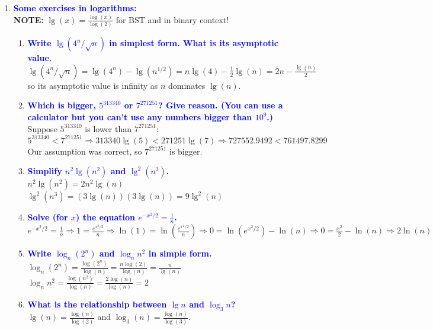 \documentclass[11pt]{article}
\begin{document}
\begin{enumerate}
    
    
\item \textbf{\textcolor{blue}{Some exercises in logarithms:}}
    \\ \textbf{NOTE: } $\lg(x) = \frac{\log(x)}{\log(2)}$ for BST and in binary context!
    \begin{enumerate}
    \item \textbf{\textcolor{blue}{Write $\lg(4^n/\sqrt{n})$ in simplest form.  What is its asymptotic value.}}
        \\ $\lg(4^n/\sqrt{n}) = \lg(4^n) - \lg(n^{1/2}) = n\lg(4) - \frac{1}{2}\lg(n) = 2n - \frac{\lg(n)}{2}$ so its asymptotic value is infinity as $n$ dominates $\lg(n)$.
    \item \textbf{\textcolor{blue}{Which is bigger, $5^{313340}$ or $7^{271251}$? Give reason. (You can use a calculator but you can't use any numbers bigger than $10^9$.)}}
        \\ Suppose $5^{313340}$ is lower than $7^{271251}$:
        \\ $5^{313340} < 7^{271251} \Rightarrow 313340\lg(5) < 271251\lg(7) \Rightarrow 727552.9492 < 761497.8299$
        \\ Our assumption was correct, so $7^{271251}$ is bigger.
    \item \textbf{\textcolor{blue}{Simplify $n^2\lg(n^2)$ and $\lg^2(n^3)$.}}
        \\ $n^2\lg(n^2) = 2n^2\lg(n)$
        \\ $\lg^2(n^3) = (3\lg(n))(3\lg(n)) = 9\lg^2(n)$
    \item \textbf{\textcolor{blue}{Solve (for $x$) the equation $e^{-x^2/2}=\frac{1}{n}$.}}
        \\ $e^{-x^2/2}=\frac{1}{n} \Rightarrow 1=\frac{e^{x^2/2}}{n} \Rightarrow \ln(1)=\ln(\frac{e^{x^2/2}}{n}) \Rightarrow 0 = \ln(e^{x^2/2}) - \ln(n) \Rightarrow 0 = \frac{x^2}{2} - \ln(n) \Rightarrow 2\ln(n) = x^2 \Rightarrow x = \mp \sqrt{2\ln(n)}$
    \item \textbf{\textcolor{blue}{Write $\log_n(2^n)$ and $\log_nn^2$ in simple form.}}
        \\ $\log_n(2^n) = \frac{\log(2^n)}{\log(n)} = \frac{n\log(2)}{\log(n)} = \frac{n}{\lg(n)}$
        \\ $\log_nn^2 = \frac{\log(n^2)}{\log(n)} = \frac{2\log(n)}{\log(n)} = 2$
    \item \textbf{\textcolor{blue}{What is the relationship between $\lg n$ and $\log_3n$?}}
        \\ $\lg(n) = \frac{\log(n)}{\log(2)}$ and $\log_3(n) = \frac{\log(n)}{\log(3)}$.

\end{enumerate}
\end{enumerate}
\end{document}
